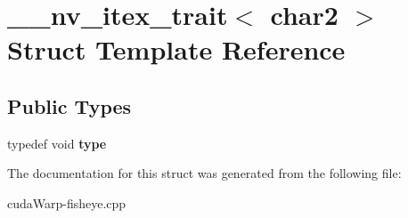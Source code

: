 \hypertarget{struct____nv__itex__trait_3_01char2_01_4}{}\section{\+\_\+\+\_\+nv\+\_\+itex\+\_\+trait$<$ char2 $>$ Struct Template Reference}
\label{struct____nv__itex__trait_3_01char2_01_4}
\subsection*{Public Types}
\begin{DoxyCompactItemize}
\item 
typedef void {\bfseries type}\hypertarget{struct____nv__itex__trait_3_01char2_01_4_a9125e6c16e84e7585f2aabfc82e15b30}{}\label{struct____nv__itex__trait_3_01char2_01_4_a9125e6c16e84e7585f2aabfc82e15b30}

\end{DoxyCompactItemize}


The documentation for this struct was generated from the following file\+:\begin{DoxyCompactItemize}
\item 
cuda\+Warp-\/fisheye.\+cpp\end{DoxyCompactItemize}
